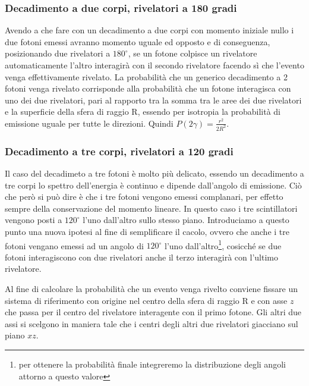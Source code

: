   \subsubsection{Decadimento a due corpi, rivelatori a 180 gradi}
  Avendo a che fare con un decadimento a due corpi con momento iniziale nullo i due fotoni emessi avranno momento uguale ed opposto e di conseguenza, posizionando due rivelatori
  a \(180^\circ\), se un fotone colpisce un rivelatore automaticamente l'altro interagirà con il secondo rivelatore facendo sì che l'evento venga effettivamente rivelato. La
  probabilità che un generico decadimento a 2 fotoni venga rivelato corrisponde alla probabilità che un fotone interagisca con  uno dei due rivelatori, pari al rapporto tra la 
  somma tra le aree dei due rivelatori e la superficie della sfera di raggio R, essendo per isotropia la probabilità di emissione uguale per tutte le direzioni. Quindi
  \(P\left(2\gamma\right) = \frac{r^2}{2R^2}\).
  \subsubsection{Decadimento a tre corpi, rivelatori a 120 gradi}
  Il caso del decadimeto a tre fotoni è molto più delicato, essendo un decadimento a tre corpi lo spettro dell'energia è continuo e dipende dall'angolo di emissione. Ciò che però
  si può dire è che i tre fotoni vengono emessi complanari, per effetto sempre della conservazione del momento lineare. In questo caso i tre scintillatori vengono posti a \(120^\circ\)
  l'uno dall'altro sullo stesso piano. Introduciamo a questo punto una nuova ipotesi al fine di semplificare il cacolo, ovvero che anche i tre fotoni vengano emessi ad un angolo di
  \(120^\circ\) l'uno dall'altro\footnote{per ottenere la probabilità finale integreremo la distribuzione degli angoli attorno a questo valore}, cosicché se due fotoni interagiscono con due rivelatori anche il terzo interagirà con l'ultimo rivelatore. 
  
  Al fine di calcolare la probabilità che un evento venga rivelto conviene fissare un sistema di riferimento con origine nel centro della sfera di raggio R
  e con asse \(z\) che passa per il centro del rivelatore interagente con il primo fotone. Gli altri due assi si scelgono in maniera tale che i centri degli altri due rivelatori
  giacciano sul piano \(xz\).\\
  
  

